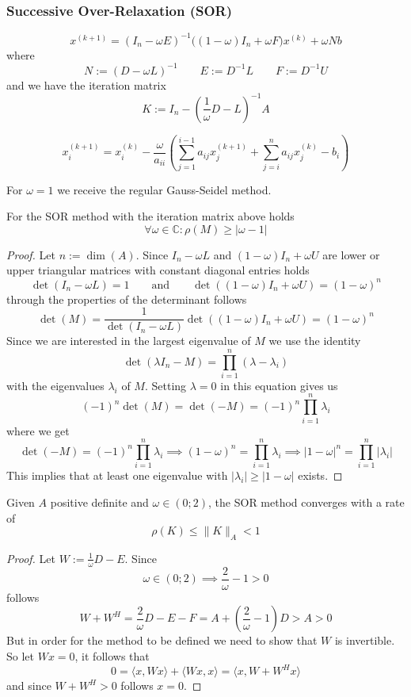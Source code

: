 \subsubsection{Successive Over-Relaxation (SOR)}
\begin{definition}
   \[x^{(k+1)} = (I_n - \omega E)^{-1} \big((1 - \omega)I_n + \omega F)x^{(k)} + \omega Nb\]
   where
   \[N := (D - \omega L)^{-1} \qquad E := D^{-1}L \qquad F := D^{-1}U\]
   and we have the iteration matrix
   \[K := I_n - \left(\frac{1}{\omega}D - L\right)^{-1}A\]
\end{definition}

\begin{definition}
   \[x_i^{(k+1)} = x_i^{(k)} - \frac{\omega}{a_{ii}} \left(\sum_{j=1}^{i-1} a_{ij} x_j^{(k+1)} + \sum_{j=i}^n a_{ij} x_j^{(k)} -b_i\right)\]
\end{definition}
\begin{remark}
   For \(\omega = 1\) we receive the regular Gauss-Seidel method.
\end{remark}

\begin{lemma}
   For the SOR method with the iteration matrix above holds
   \[\forall \omega \in \mathbb{C}: \rho(M) \geq |\omega - 1|\]
\end{lemma}
\begin{proof}
   Let \(n := \dim(A)\).
   Since \(I_n - \omega L\) and \((1 - \omega)I_n + \omega U\) are lower or upper triangular matrices with constant diagonal entries holds
   \[\det(I_n - \omega L) = 1 \qquad\text{and}\qquad \det((1 - \omega)I_n + \omega U) = (1 - \omega)^n\]
   through the properties of the determinant follows
   \[\det(M) = \frac{1}{\det(I_n - \omega L)} \det((1 - \omega)I_n + \omega U) = (1 - \omega)^n\]
   Since we are interested in the largest eigenvalue of \(M\) we use the identity
   \[\det(\lambda I_n - M) = \prod_{i = 1}^n(\lambda - \lambda_i)\]
   with the eigenvalues \(\lambda_i\) of \(M\).
   Setting \(\lambda = 0\) in this equation gives us
   \[(-1)^n \det(M) = \det(-M) = (-1)^n \prod_{i = 1}^n \lambda_i\]
   where we get
   \[\det(-M) = (-1)^n \prod_{i = 1}^n \lambda_i \implies (1 - \omega)^n = \prod_{i = 1}^n \lambda_i \implies |1 - \omega|^n = \prod_{i=1}^n |\lambda_i|\]
   This implies that at least one eigenvalue with \(|\lambda_i| \geq |1 - \omega|\) exists.
\end{proof}

\begin{theorem}
   Given \(A\) positive definite and \(\omega \in (0; 2)\), the SOR method converges with a rate of
   \[\rho(K) \leq \|K\|_A < 1\]
\end{theorem}
\begin{proof}
   Let \(W := \frac{1}{\omega} D - E\).
   Since
   \[\omega \in (0; 2) \implies \frac{2}{\omega} - 1 > 0\]
   follows
   \[W + W^H = \frac{2}{\omega}D - E - F = A + \left(\frac{2}{\omega} - 1\right)D > A > 0\]
   But in order for the method to be defined we need to show that \(W\) is invertible.
   So let \(Wx = 0\), it follows that
   \[0 = \langle x, Wx \rangle + \langle Wx, x \rangle = \langle x, W + W^H x \rangle\]
   and since \(W + W^H > 0\) follows \(x = 0\).
\end{proof}

